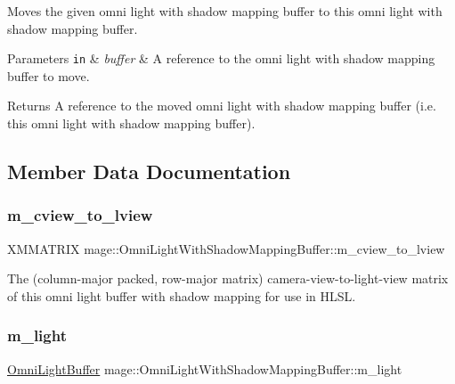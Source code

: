 Moves the given omni light with shadow mapping buffer to this omni light with shadow mapping buffer.


\begin{DoxyParams}[1]{Parameters}
\mbox{\tt in}  & {\em buffer} & A reference to the omni light with shadow mapping buffer to move. \\
\hline
\end{DoxyParams}
\begin{DoxyReturn}{Returns}
A reference to the moved omni light with shadow mapping buffer (i.\+e. this omni light with shadow mapping buffer). 
\end{DoxyReturn}


\subsection{Member Data Documentation}
\hypertarget{structmage_1_1_omni_light_with_shadow_mapping_buffer_ac8818649198198519826adf18fe0da7d}{}\label{structmage_1_1_omni_light_with_shadow_mapping_buffer_ac8818649198198519826adf18fe0da7d} 
\subsubsection{\texorpdfstring{m\+\_\+cview\+\_\+to\+\_\+lview}{m\_cview\_to\_lview}}
{\footnotesize\ttfamily X\+M\+M\+A\+T\+R\+IX mage\+::\+Omni\+Light\+With\+Shadow\+Mapping\+Buffer\+::m\+\_\+cview\+\_\+to\+\_\+lview}

The (column-\/major packed, row-\/major matrix) camera-\/view-\/to-\/light-\/view matrix of this omni light buffer with shadow mapping for use in H\+L\+SL. \hypertarget{structmage_1_1_omni_light_with_shadow_mapping_buffer_ad04cdb09bc31de362f8f4f75aa5b6aea}{}\label{structmage_1_1_omni_light_with_shadow_mapping_buffer_ad04cdb09bc31de362f8f4f75aa5b6aea} 
\subsubsection{\texorpdfstring{m\+\_\+light}{m\_light}}
{\footnotesize\ttfamily \hyperlink{structmage_1_1_omni_light_buffer}{Omni\+Light\+Buffer} mage\+::\+Omni\+Light\+With\+Shadow\+Mapping\+Buffer\+::m\+\_\+light}


